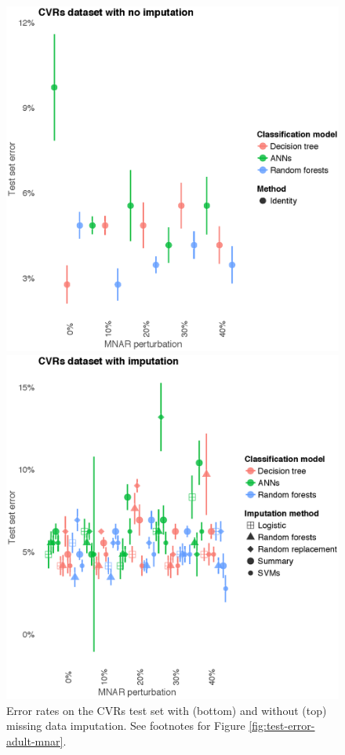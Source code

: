 \documentclass[10pt]{book}
\theoremstyle{definition}
\begin{document}
\begin{figure}[h!]
\includegraphics[scale=0.55, center]{figure/test-errors-votes-no-imp-mnar}\par
\includegraphics[scale=0.55, center]{figure/test-errors-votes-imp-mnar}\par
   \caption{\footnotesize Error rates on the CVRs test set with (bottom) and without (top) missing data imputation. See footnotes for Figure \ref{fig:test-error-adult-mnar}.}
   \label{fig:test-error-votes-mnar}
\end{figure}
\end{document}
